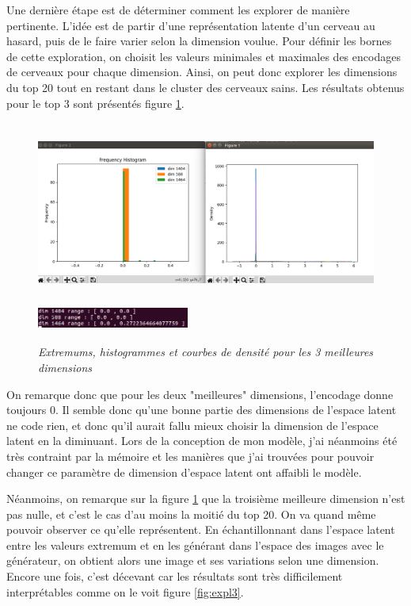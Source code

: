 \documentclass[12pt, oneside, a4paper, titlepage]{article}
\begin{document}
Une dernière étape est de déterminer comment les explorer de manière pertinente. L'idée est de partir d'une représentation latente d'un cerveau au hasard, puis de le faire varier selon la dimension voulue. Pour définir les bornes de cette exploration, on choisit les valeurs minimales et maximales des encodages de cerveaux pour chaque dimension. Ainsi, on peut donc explorer les dimensions du top 20 tout en restant dans le cluster des cerveaux sains. Les résultats obtenus pour le top 3 sont présentés figure \ref{fig:range2}.

\vspace{1cm}
\begin{figure}[H]
\centering
\includegraphics[width=13cm, height=6cm]{histotop3.png}
\includegraphics[width=5cm, height=0.8cm]{rangetop3.png}
    \caption{\textit{Extremums, histogrammes et courbes de densité pour les 3 meilleures dimensions}}
    \label{fig:range2}
\end{figure}

On remarque donc que pour les deux "meilleures" dimensions, l'encodage donne toujours 0. Il semble donc qu'une bonne partie des dimensions de l'espace latent ne code rien, et donc qu'il aurait fallu mieux choisir la dimension de l'espace latent en la diminuant. Lors de la conception de mon modèle, j'ai néanmoins été très contraint par la mémoire et les manières que j'ai trouvées pour pouvoir changer ce paramètre de dimension d'espace latent ont affaibli le modèle.

Néanmoins, on remarque sur la figure \ref{fig:range2} que la troisième meilleure dimension n'est pas nulle, et c'est le cas d'au moins la moitié du top 20. On va quand même pouvoir observer ce qu'elle représentent. En échantillonnant dans l'espace latent entre les valeurs extremum et en les générant dans l'espace des images avec le générateur, on obtient alors une image et ses variations selon une dimension. Encore une fois, c'est décevant car les résultats sont très difficilement interprétables comme on le voit figure \ref{fig:expl3}.
\end{document}
